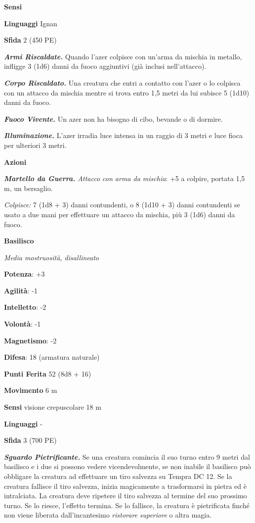 \begin{multicols}{2}
\textbf{Sensi} 

\textbf{Linguaggi} Ignan

\textbf{Sfida} 2 (450 PE)

\emph{\textbf{Armi Riscaldate.}} Quando l'azer colpisce con un'arma da
mischia in metallo, infligge 3 (1d6) danni da fuoco aggiuntivi (già
inclusi nell'attacco).

\emph{\textbf{Corpo Riscaldato.}} Una creatura che entri a contatto con
l'azer o lo colpisca con un attacco da mischia mentre si trova entro 1,5
metri da lui subisce 5 (1d10) danni da fuoco.

\emph{\textbf{Fuoco Vivente.}} Un azer non ha bisogno di cibo, bevande o
di dormire.

\emph{\textbf{Illuminazione.}} L'azer irradia luce intensa in un raggio
di 3 metri e luce fioca per ulteriori 3 metri.

\textbf{Azioni}

\emph{\textbf{Martello da Guerra.} Attacco con arma da mischia}: +5 a
colpire, portata 1,5 m, un bersaglio.

\emph{Colpisce:} 7 (1d8 + 3) danni contundenti, o 8 (1d10 + 3) danni
contundenti se usato a due mani per effettuare un attacco da mischia,
più 3 (1d6) danni da fuoco.

\textbf{Basilisco}

\emph{Media mostruosità, disallineato}

\textbf{Potenza}: +3

\textbf{Agilità}: -1

\textbf{Intelletto}: -2

\textbf{Volontà}: -1

\textbf{Magnetismo}: -2

\textbf{Difesa}: 18 (armatura naturale)

\textbf{Punti Ferita} 52 (8d8 + 16)

\textbf{Movimento} 6 m

\textbf{Sensi} visione crepuscolare 18 m

\textbf{Linguaggi} -

\textbf{Sfida} 3 (700 PE)

\emph{\textbf{Sguardo Pietrificante.}} Se una creatura comincia il suo
turno entro 9 metri dal basilisco e i due si possono vedere
vicendevolmente, se non inabile il basilisco può obbligare la creatura ad effettuare un tiro salvezza su Tempra DC 12. Se la creatura fallisce il tiro  salvezza, inizia magicamente a trasformarsi in pietra ed è   intralciata. La creatura deve ripetere il tiro salvezza al termine del   suo prossimo turno. Se lo riesce, l'effetto termina. Se lo fallisce,   la creatura è pietrificata finché non viene liberata dall'incantesimo  \emph{ristorare} \emph{superiore} o altra magia.



\end{multicols}
